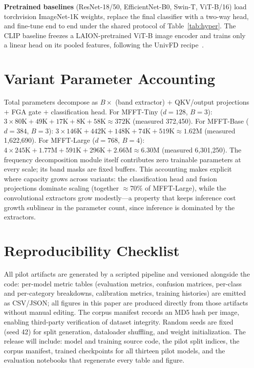\documentclass[journal]{IEEEtran}
\begin{document}
\textbf{Pretrained baselines} (ResNet-18/50, EfficientNet-B0, Swin-T, ViT-B/16) load torchvision ImageNet-1K weights, replace the final classifier with a two-way head, and fine-tune end to end under the shared protocol of Table~\ref{tab:hyper}. The CLIP baseline freezes a LAION-pretrained ViT-B image encoder and trains only a linear head on its pooled features, following the UnivFD recipe~\cite{ojha2023}.

\section{Variant Parameter Accounting}
\label{app:params}
Total parameters decompose as $B \times$ (band extractor) $+$ QKV/output projections $+$ FGA gate $+$ classification head. For MFFT-Tiny ($d{=}128$, $B{=}3$): $3 \times 80\mathrm{K} + 49\mathrm{K} + 17\mathrm{K} + 8\mathrm{K} + 58\mathrm{K} \approx 372\mathrm{K}$ (measured 372{,}450). For MFFT-Base ($d{=}384$, $B{=}3$): $3 \times 146\mathrm{K} + 442\mathrm{K} + 148\mathrm{K} + 74\mathrm{K} + 519\mathrm{K} \approx 1.62\mathrm{M}$ (measured 1{,}622{,}690). For MFFT-Large ($d{=}768$, $B{=}4$): $4 \times 245\mathrm{K} + 1.77\mathrm{M} + 591\mathrm{K} + 296\mathrm{K} + 2.66\mathrm{M} \approx 6.30\mathrm{M}$ (measured 6{,}301{,}250). The frequency decomposition module itself contributes zero trainable parameters at every scale; its band masks are fixed buffers. This accounting makes explicit where capacity grows across variants: the classification head and fusion projections dominate scaling (together $\approx$70\% of MFFT-Large), while the convolutional extractors grow modestly---a property that keeps inference cost growth sublinear in the parameter count, since inference is dominated by the extractors.

\section{Reproducibility Checklist}
\label{app:repro}
All pilot artifacts are generated by a scripted pipeline and versioned alongside the code: per-model metric tables (evaluation metrics, confusion matrices, per-class and per-category breakdowns, calibration metrics, training histories) are emitted as CSV/JSON; all figures in this paper are produced directly from those artifacts without manual editing. The corpus manifest records an MD5 hash per image, enabling third-party verification of dataset integrity. Random seeds are fixed (seed 42) for split generation, dataloader shuffling, and weight initialization. The release will include: model and training source code, the pilot split indices, the corpus manifest, trained checkpoints for all thirteen pilot models, and the evaluation notebooks that regenerate every table and figure.
\end{document}

